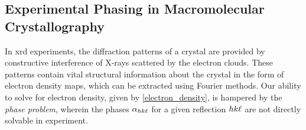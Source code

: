 

\subsection{Experimental Phasing in Macromolecular Crystallography}




In \ac{xrd} experiments, the diffraction patterns of a crystal are provided by constructive interference of X-rays scattered by the electron clouds. These patterns contain vital structural information about the crystal in the form of electron density maps, which can be extracted using Fourier methods. Our ability to solve for electron density, given by \cref{electron_density}, is hampered by the \textit{phase problem}, wherein the phases $\alpha_{hk\ell}$ for a given reflection $hk\ell$ are not directly solvable in experiment. 

